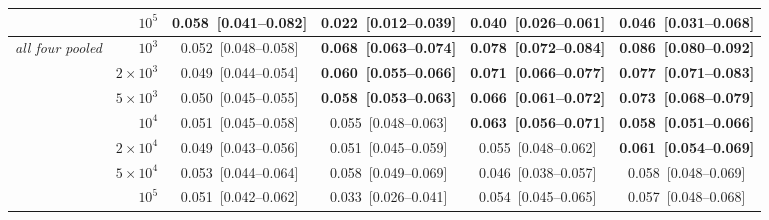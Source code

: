\begin{table}[p]
{\begin{tabular}{lrcccc}
 & $10^5$ & 0.058~[0.041--0.082] & 0.022~[0.012--0.039] & 0.040~[0.026--0.061] & 0.046~[0.031--0.068] \\
\midrule
\emph{all four pooled} & $10^3$ & 0.052~[0.048--0.058] & \textbf{0.068~[0.063--0.074]} & \textbf{0.078~[0.072--0.084]} & \textbf{0.086~[0.080--0.092]} \\
 & $2\times10^3$ & 0.049~[0.044--0.054] & \textbf{0.060~[0.055--0.066]} & \textbf{0.071~[0.066--0.077]} & \textbf{0.077~[0.071--0.083]} \\
 & $5\times10^3$ & 0.050~[0.045--0.055] & \textbf{0.058~[0.053--0.063]} & \textbf{0.066~[0.061--0.072]} & \textbf{0.073~[0.068--0.079]} \\
 & $10^4$ & 0.051~[0.045--0.058] & 0.055~[0.048--0.063] & \textbf{0.063~[0.056--0.071]} & \textbf{0.058~[0.051--0.066]} \\
 & $2\times10^4$ & 0.049~[0.043--0.056] & 0.051~[0.045--0.059] & 0.055~[0.048--0.062] & \textbf{0.061~[0.054--0.069]} \\
 & $5\times10^4$ & 0.053~[0.044--0.064] & 0.058~[0.049--0.069] & 0.046~[0.038--0.057] & 0.058~[0.048--0.069] \\
 & $10^5$ & 0.051~[0.042--0.062] & 0.033~[0.026--0.041] & 0.054~[0.045--0.065] & 0.057~[0.048--0.068] \\
\bottomrule
\end{tabular}}
\end{table}

